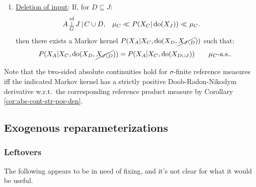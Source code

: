 \begin{Cor}
\begin{enumerate}
\begin{align*}
                   && \mu_C &\ll P(X_C|\doit(X_J)) \ll \mu_C.
         \end{align*}
       \item \underline{Deletion of input}:
         If, for $D \subseteq J$: 
         \begin{align*} 
           A &\operatorname*{\perp}^{id}_G J \operatorname*{|} C \cup D, &          
             \mu_C &\ll P(X_C|\operatorname{do}(X_J)) \ll \mu_C.
         \end{align*}
         then there exists a Markov kernel $P(X_A|X_C,\operatorname{do}(X_{D},\cancel{X_{J\setminus D}}))$ such that:
         \[ P(X_A|X_C,\operatorname{do}(X_{D},\cancel{X_{J\setminus D}})) = P(X_A|X_C,\operatorname{do}(X_{D \cup J})) \qquad \mu_C\text{-a.s.}. \]
    \end{enumerate}
    Note that the two-sided absolute continuities hold for $\sigma$-finite reference measures iff the indicated Markov kernel has a strictly positive Doob-Radon-Nikodym derivative w.r.t.\ the corresponding reference product measure by Corollary \ref{cor:abs-cont-str-pos-den}.
\end{Cor}

\clearpage

\clearpage
\subsection{Exogenous reparameterizations}

\subsubsection{Leftovers}

The following appears to be in need of fixing, and it's not clear for what it would be useful.


